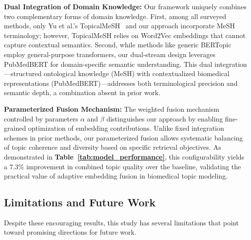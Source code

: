 \documentclass[authorproof,JACIII,researchpaper]{fujipressarticle}
\begin{document}
\textbf{Dual Integration of Domain Knowledge:} Our framework uniquely combines two complementary forms of domain knowledge. First, among all surveyed methods, only Yu et al.'s TopicalMeSH~\cite{yu_improving_2016} and our approach incorporate MeSH terminology; however, TopicalMeSH relies on Word2Vec embeddings that cannot capture contextual semantics. Second, while methods like generic BERTopic~\cite{grootendorst_bertopic_2022} employ general-purpose transformers, our dual-stream design leverages PubMedBERT for domain-specific semantic understanding. This dual integration---structured ontological knowledge (MeSH) with contextualized biomedical representations (PubMedBERT)---addresses both terminological precision and semantic depth, a combination absent in prior work.

\textbf{Parameterized Fusion Mechanism:} The weighted fusion mechanism controlled by parameters $\alpha$ and $\beta$ distinguishes our approach by enabling fine-grained optimization of embedding contributions. Unlike fixed integration schemes in prior methods, our parameterized fusion allows systematic balancing of topic coherence and diversity based on specific retrieval objectives. {\color{red}As demonstrated in \textbf{Table~\ref{tab:model_performance}}, this configurability yields a $7.3\%$ improvement in combined topic quality over the baseline, validating the practical value of adaptive embedding fusion in biomedical topic modeling.}

\subsection{Limitations and Future Work}

{\color{red}%
Despite these encouraging results, this study has several limitations that point toward promising directions for future work.
}%
\end{document}
